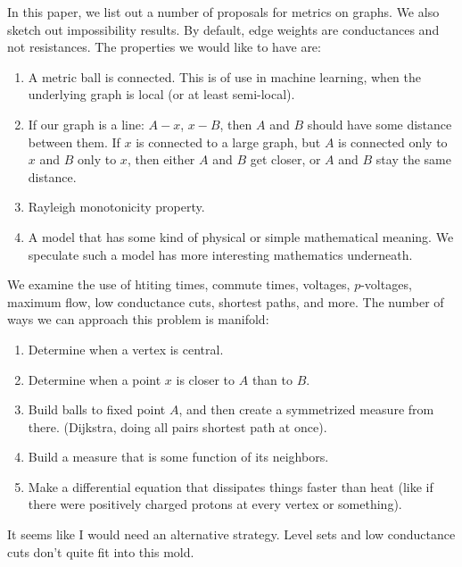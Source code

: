 In this paper, we list out a number of proposals for metrics on
graphs. We also sketch out impossibility results. By default,
edge weights are conductances and not resistances. The properties
we would like to have are:

\begin{enumerate}
\item A metric ball is connected. This is of use in machine
learning, when the underlying graph is local (or at least
semi-local).
\item If our graph is a line: $A-x$, $x-B$, then $A$ and $B$
should have some distance between them. If $x$ is connected to a
large graph, but $A$ is connected only to $x$ and $B$ only to
$x$, then either $A$ and $B$ get closer, or $A$ and $B$ stay the
same distance.
\item Rayleigh monotonicity property.
\item A model that has some kind of physical or simple
mathematical meaning. We speculate such a model has more
interesting mathematics underneath.
\end{enumerate}

We examine the use of htiting times, commute times, voltages,
$p$-voltages, maximum flow, low conductance cuts, shortest paths, and more. The
number of ways we can approach this problem is manifold:
\begin{enumerate}
\item Determine when a vertex is central.
\item Determine when a point $x$ is closer to $A$ than to $B$.
\item Build balls to fixed point $A$, and then create a
symmetrized measure from there. (Dijkstra, doing all pairs
    shortest path at once).
\item Build a measure that is some function of its neighbors.
\item Make a differential equation that dissipates things faster
than heat (like if there were positively charged protons at
    every vertex or something).
\end{enumerate}
It seems like I would need an alternative strategy. Level sets
and low conductance cuts don't quite fit into this mold.

